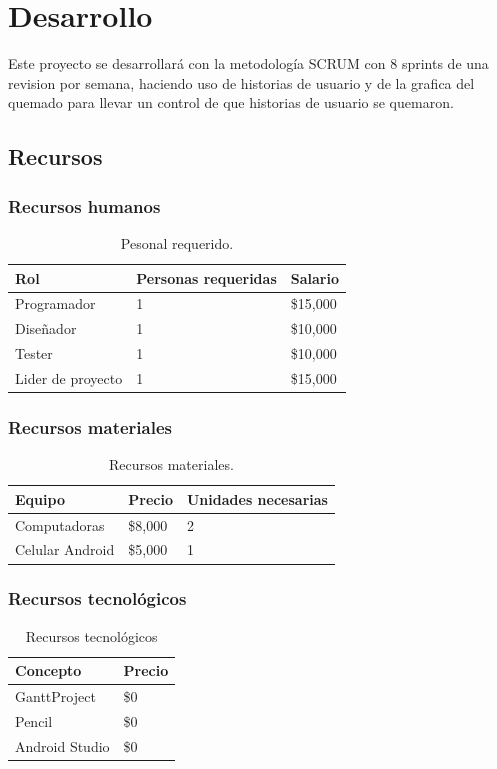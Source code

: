 \chapter{Desarrollo}
Este proyecto se desarrollará con la metodología SCRUM con 8 sprints de una revision por semana, haciendo uso de historias de usuario y de la grafica del quemado para llevar un control de que historias de usuario se quemaron.

\section{Recursos}
\subsection{Recursos humanos}
\begin{table}[H]
\centering
\begin{tabular}{|l|l|l|}
\hline
Rol               & Personas requeridas & Salario  \\ \hline
Programador       & 1                   & \$15,000 \\ \hline
Diseñador         & 1                   & \$10,000 \\ \hline
Tester            & 1                   & \$10,000 \\ \hline
Lider de proyecto & 1                   & \$15,000 \\ \hline
\end{tabular}
\caption{Pesonal requerido.}
\label{personal}
\end{table}

\subsection{Recursos materiales}
\begin{table}[H]
\centering
\begin{tabular}{|l|l|l|}
\hline
Equipo          & Precio  & Unidades necesarias \\ \hline
Computadoras    & \$8,000 & 2                   \\ \hline
Celular Android & \$5,000 & 1                   \\ \hline
\end{tabular}
\caption{Recursos materiales.}
\label{materiales}
\end{table}

\subsection{Recursos tecnológicos}
\begin{table}[H]
\centering
\begin{tabular}{|l|l|}
\hline
Concepto       & Precio  \\ \hline
GanttProject   & \$0 \\ \hline
Pencil         & \$0 \\ \hline
Android Studio & \$0 \\ \hline
\end{tabular}
\caption{Recursos tecnológicos}
\label{tecnologicos}
\end{table}

